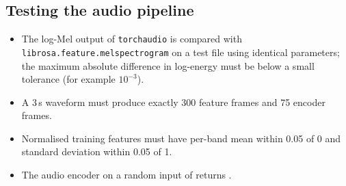 \subsection{Testing the audio pipeline}
\begin{itemize}
  \item The log-Mel output of \texttt{torchaudio} is compared with
        \texttt{librosa.feature.melspectrogram} on a test file using identical
        parameters; the maximum absolute difference in log-energy must be below a
        small tolerance (for example $10^{-3}$).
  \item A 3\,s waveform must produce exactly 300 feature frames and 75 encoder
        frames.
  \item Normalised training features must have per-band mean within 0.05 of 0
        and standard deviation within 0.05 of 1.
  \item The audio encoder on a random input of  returns
        .
\end{itemize}
